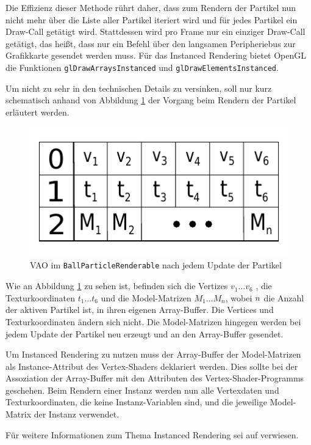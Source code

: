 Die Effizienz dieser Methode rührt daher, dass zum Rendern der Partikel nun nicht mehr über die Liste aller Partikel iteriert wird und für jedes Partikel ein Draw-Call getätigt wird. Stattdessen wird pro Frame nur ein einziger Draw-Call getätigt, das heißt, dass nur ein Befehl über den langsamen Peripheriebus zur Grafikkarte gesendet werden muss. Für das Instanced Rendering bietet OpenGL die Funktionen {\texttt{glDrawArraysInstanced}} und {\texttt{glDrawElementsInstanced}}.

Um nicht zu sehr in den technischen Details zu versinken, soll nur kurz schematisch anhand von Abbildung \ref{fig:vao} der Vorgang beim Rendern der Partikel erläutert werden.

\begin{figure}[h]
	\centering
	\includegraphics[scale=0.8]{bilder/vao}
	\caption{VAO im {\texttt{BallParticleRenderable}} nach jedem Update der Partikel}
	\label{fig:vao}
\end{figure}

Wie an Abbildung \ref{fig:vao} zu sehen ist, befinden sich die Vertizes $v_1\dotsc v_6$ , die Texturkoordinaten $t_1\dotsc t_6$ und die Model-Matrizen $M_1\dotsc M_n$, wobei $\mathnormal{n}$ die Anzahl der aktiven Partikel ist, in ihren eigenen Array-Buffer. Die Vertices und Texturkoordinaten ändern sich nicht. Die Model-Matrizen hingegen werden bei jedem Update der Partikel neu erzeugt und an den Array-Buffer gesendet.

Um Instanced Rendering zu nutzen muss der Array-Buffer der Model-Matrizen als Instance-Attribut des Vertex-Shaders deklariert werden. Dies sollte bei der Assoziation der Array-Buffer mit den Attributen des Vertex-Shader-Programms geschehen.
Beim Rendern einer Instanz werden nun alle Vertexdaten und Texturkoordinaten, die keine Instanz-Variablen sind, und die jeweilige Model-Matrix der Instanz verwendet.

Für weitere Informationen zum Thema Instanced Rendering sei auf \cite{ksls:2013} verwiesen.

